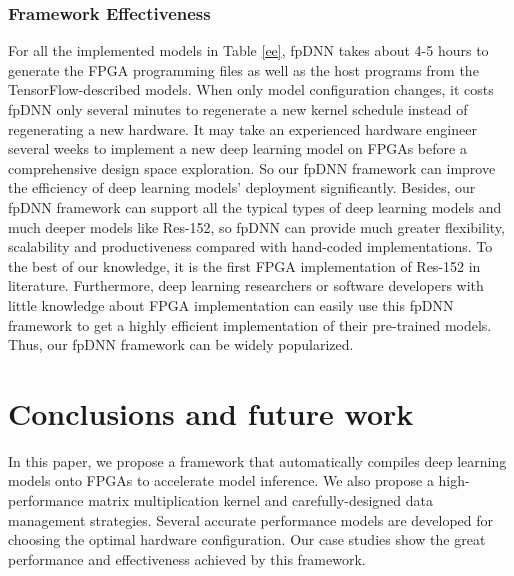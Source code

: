 \documentclass{acm_proc_article-sp-copy}
\begin{document}
\subsubsection{Framework Effectiveness}
For all the implemented models in Table \ref{ee}, fpDNN takes about 4-5 hours to generate the FPGA programming files as well as the host programs from the TensorFlow-described models. When only model configuration changes, it costs fpDNN only several minutes to regenerate a new kernel schedule instead of regenerating a new hardware. It may take an experienced hardware engineer several weeks to implement a new deep learning model on FPGAs before a comprehensive design space exploration. So our fpDNN framework can improve the efficiency of deep learning models' deployment significantly.
Besides, our fpDNN framework can support all the typical types of deep learning models and much deeper models like Res-152, so fpDNN can provide much greater flexibility, scalability and productiveness compared with hand-coded implementations. To the best of our knowledge, it is the first FPGA implementation of Res-152 in literature.
Furthermore, deep learning researchers or software developers with little knowledge about FPGA implementation can easily use this fpDNN framework to get a highly efficient implementation of their pre-trained models. Thus, our fpDNN framework can be widely popularized.


\vspace{-3pt}
\section{Conclusions and future work}
In this paper, we propose a framework that automatically compiles deep learning models onto FPGAs to accelerate model inference. We also propose a high-performance matrix multiplication kernel and carefully-designed data management strategies. Several accurate performance models are developed for choosing the optimal hardware configuration. Our case studies show the great performance and effectiveness achieved by this framework.
\end{document}
